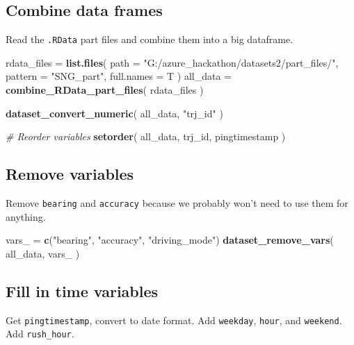 \documentclass[]{article}
\newenvironment{Shaded}{\begin{snugshade}}{\end{snugshade}}
\newcommand{\CommentTok}[1]{\textcolor[rgb]{0.56,0.35,0.01}{\textit{#1}}}
\newcommand{\DataTypeTok}[1]{\textcolor[rgb]{0.13,0.29,0.53}{#1}}
\newcommand{\KeywordTok}[1]{\textcolor[rgb]{0.13,0.29,0.53}{\textbf{#1}}}
\newcommand{\NormalTok}[1]{#1}
\newcommand{\StringTok}[1]{\textcolor[rgb]{0.31,0.60,0.02}{#1}}
\begin{document}
\hypertarget{combine-data-frames}{%
\subsection{Combine data frames}\label{combine-data-frames}}

Read the \texttt{.RData} part files and combine them into a big
dataframe.

\begin{Shaded}
\begin{Highlighting}[]
\NormalTok{rdata_files =}\StringTok{ }\KeywordTok{list.files}\NormalTok{( }\DataTypeTok{path =} \StringTok{"G:/azure_hackathon/datasets2/part_files/"}\NormalTok{,}
    \DataTypeTok{pattern =} \StringTok{"SNG_part"}\NormalTok{, }\DataTypeTok{full.names =}\NormalTok{ T )}
\NormalTok{all_data =}\StringTok{ }\KeywordTok{combine_RData_part_files}\NormalTok{( rdata_files )}

\KeywordTok{dataset_convert_numeric}\NormalTok{( all_data, }\StringTok{"trj_id"}\NormalTok{ )}

\CommentTok{# Reorder variables}
\KeywordTok{setorder}\NormalTok{( all_data, trj_id, pingtimestamp )}
\end{Highlighting}
\end{Shaded}

\hypertarget{remove-variables}{%
\subsection{Remove variables}\label{remove-variables}}

Remove \texttt{bearing} and \texttt{accuracy} because we probably won't
need to use them for anything.

\begin{Shaded}
\begin{Highlighting}[]
\NormalTok{vars_ =}\StringTok{ }\KeywordTok{c}\NormalTok{(}\StringTok{"bearing"}\NormalTok{, }\StringTok{"accuracy"}\NormalTok{, }\StringTok{"driving_mode"}\NormalTok{)}
\KeywordTok{dataset_remove_vars}\NormalTok{( all_data, vars_ )}
\end{Highlighting}
\end{Shaded}

\hypertarget{fill-in-time-variables}{%
\subsection{Fill in time variables}\label{fill-in-time-variables}}

Get \texttt{pingtimestamp}, convert to date format. Add
\texttt{weekday}, \texttt{hour}, and \texttt{weekend}. Add
\texttt{rush\_hour}.
\end{document}
